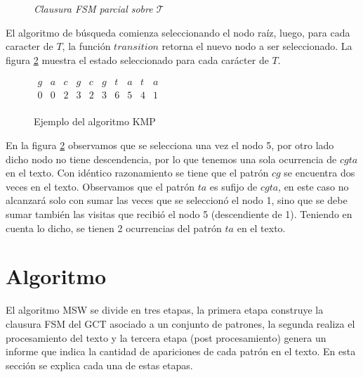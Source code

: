 \begin{example*}
\begin{figure}[H]
\caption[Ejemplo: Clausura FSM]{{\it Clausura FSM parcial sobre $\mathcal{T}$}}
	\label{fig:clausura_fsm}
\end{figure}
El algoritmo de búsqueda comienza seleccionando el nodo raíz, luego, para cada caracter de $T$, la función $transition$ retorna el nuevo nodo a ser seleccionado. La figura \ref{fig:fsm_state_matrix} muestra el estado seleccionado para cada carácter de $T$. 
\begin{center}
\begin{figure} [H]
\centering
$\begin{matrix}
g& a & c & g & c & g & t & a & t & a\\
0 & 0 & 2 & 3 & 2 & 3 & 6 & 5 & 4 & 1 \\
\end{matrix}$
	\caption[Ejemplo del algoritmo KMP]{Ejemplo del algoritmo KMP}
	\label{fig:fsm_state_matrix}
\end{figure}
\end{center}
En la figura \ref{fig:fsm_state_matrix} observamos que se selecciona una vez el nodo 5, por otro lado dicho nodo no tiene descendencia, por lo que tenemos una sola ocurrencia de $cgta$ en el texto. Con idéntico razonamiento se tiene que el patrón $cg$ se encuentra dos veces en el texto. Observamos que el patrón $ta$ es sufijo de $cgta$, en este caso no alcanzará solo con sumar las veces que se seleccionó el nodo 1, sino que se debe sumar también las visitas que recibió el nodo 5 (descendiente de 1). Teniendo en cuenta lo dicho, se tienen 2 ocurrencias del patrón $ta$ en el texto.
\end{example*}
\myrule{}{}

\section{Algoritmo}
\label{sec:algoritmo_MSW}
El algoritmo MSW se divide en tres etapas, la primera etapa construye la clausura FSM del GCT asociado a un conjunto de patrones, la segunda realiza el procesamiento del texto y la tercera etapa (post procesamiento) genera un informe que indica la cantidad de apariciones de cada patrón en el texto.
En esta sección se explica cada una de estas etapas.
